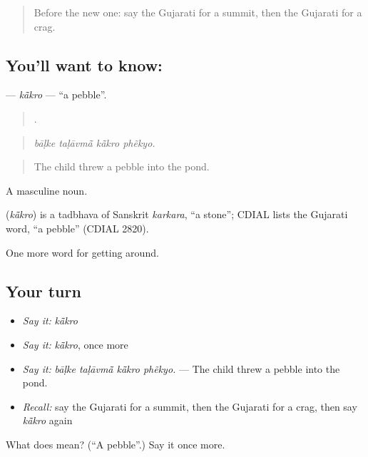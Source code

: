 \begin{quote}
Before the new one: say the Gujarati for a summit, then the Gujarati for a crag.
\end{quote}

\subsection*{You'll want to know: }
\textbf{} — \emph{kā̃kro} — \textquotedblleft{}a pebble\textquotedblright{}.

\begin{quote}
   .
\end{quote}

\begin{quote}
\emph{bāḷke taḷāvmā̃ kā̃kro phẽkyo.}
\end{quote}

\begin{quote}
The child threw a pebble into the pond.
\end{quote}

A masculine noun.

\begin{cousinweb}
\textbf{} (\emph{kā̃kro}) is a tadbhava of Sanskrit \emph{karkara}, \textquotedblleft{}a stone\textquotedblright{}; CDIAL lists the Gujarati word, \textquotedblleft{}a pebble\textquotedblright{} (CDIAL 2820).
\end{cousinweb}

\begin{grammarlens}[title={What you've built}]
One more word for getting around.
\end{grammarlens}

\subsection*{Your turn}
\begin{itemize}
\raggedright
  \item \emph{Say it:} \emph{kā̃kro}
  \item \emph{Say it:} \emph{kā̃kro}, once more
  \item \emph{Say it:} \emph{bāḷke taḷāvmā̃ kā̃kro phẽkyo.} — The child threw a pebble into the pond.
  \item \emph{Recall:} say the Gujarati for a summit, then the Gujarati for a crag, then say \emph{kā̃kro} again
\end{itemize}

\begin{tcolorbox}[breakable,colback=teal!4,colframe=teal!35!black,title={Before you move on}]
What does  mean? (\textquotedblleft{}A pebble\textquotedblright{}.) Say it once more.
\end{tcolorbox}

